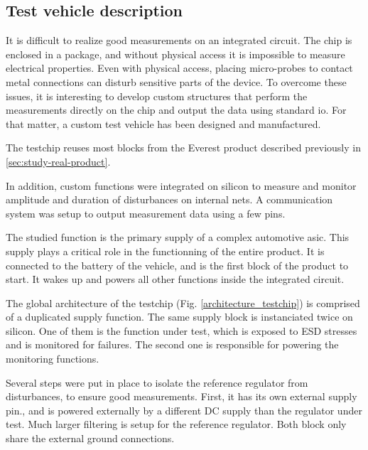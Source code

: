 \subsection{Test vehicle description}
\label{sec:test-vehicle-desc}

It is difficult to realize good measurements on an integrated circuit.
The chip is enclosed in a package, and without physical access it is impossible to measure electrical properties.
Even with physical access, placing micro-probes to contact metal connections can disturb sensitive parts of the device.
To overcome these issues, it is interesting to develop custom structures that perform the measurements directly on the chip and output the data using standard \gls{io}.
For that matter, a custom test vehicle has been designed and manufactured.

The testchip reuses most blocks from the Everest product described previously in \ref{sec:study-real-product}.

In addition, custom functions were integrated on silicon to measure and monitor amplitude and duration of disturbances on internal nets.
A communication system was setup to output measurement data using a few pins.


The studied function is the primary supply of a complex automotive \gls{asic}.
This supply plays a critical role in the functionning of the entire product.
It is connected to the battery of the vehicle, and is the first block of the product to start.
It wakes up and powers all other functions inside the integrated circuit.

The global architecture of the testchip (Fig. \ref{architecture_testchip}) is comprised of a duplicated supply function.
The same supply block is instanciated twice on silicon.
One of them is the function under test, which is exposed to \gls{ESD} stresses and is monitored for failures.
The second one is responsible for powering the monitoring functions.

Several steps were put in place to isolate the reference regulator from disturbances, to ensure good measurements.
First, it has its own external supply pin., and is powered externally by a different DC supply than the regulator under test.
Much larger filtering is setup for the reference regulator.
Both block only share the external ground connections.

